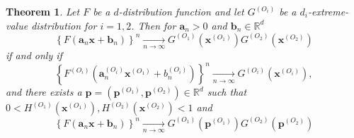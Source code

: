 \documentclass[11pt]{article}
\newtheorem{theorem}{Theorem}
\theoremstyle{definition}
\begin{document}
	\begin{theorem}
		\label{thm:ext_takahashi}
		Let $F$ be a $d$-distribution function and let $G^{(O_i)}$ be a $d_i$-extreme-value distribution for $i = 1,2$. Then for $\textbf{a}_n > 0$ and $\textbf{b}_n \in \mathbb{R}^d$
		\begin{equation}
			\label{eq:app_product}
			\left\{ F(\textbf{a}_n \textbf{x} + \textbf{b}_n) \right\}^n \underset{n \rightarrow \infty}{\longrightarrow} G^{(O_1)}(\textbf{x}^{(O_1)}) G^{(O_2)}(\textbf{x}^{(O_2)})
		\end{equation}
		if and only if
		\begin{equation}
			\label{eq:app_weak_conv}
			\left\{ F^{(O_i)} (\textbf{a}_n^{(O_i)} \textbf{x}^{(O_1)} + b_n^{(O_i)}) \right\}^{n} \underset{n \rightarrow \infty}{\longrightarrow} G^{(O_i)}(\textbf{x}^{(O_i)}),
		\end{equation}
		and there exists a $\textbf{p} = (\textbf{p}^{(O_1)}, \textbf{p}^{(O_2)}) \in \mathbb{R}^d$ such that $0 < H^{(O_1)}(\textbf{x}^{(O_1)}), H^{(O_2)}(\textbf{x}^{(O_2)}) < 1$ and
		\begin{equation}
			\label{eq:app_product_onepoint}
			\left\{ F(\textbf{a}_n \textbf{x} + \textbf{b}_n) \right\}^n \underset{n \rightarrow \infty}{\longrightarrow} G^{(O_1)}(\textbf{p}^{(O_1)}) G^{(O_2)}(\textbf{p}^{(O_2)})
		\end{equation}
	\end{theorem}
\end{document}

